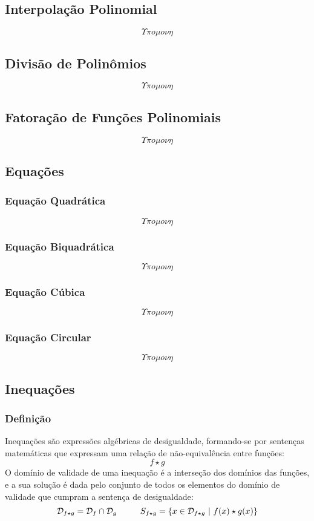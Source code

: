     \subsection{Interpolação Polinomial}
        \[ \Upsilon \pi o \mu o \nu \eta \]
    \subsection{Divisão de Polinômios}
        \[ \Upsilon \pi o \mu o \nu \eta \]
    \subsection{Fatoração de Funções Polinomiais}
        \[ \Upsilon \pi o \mu o \nu \eta \]
\subsection{Equações}
    \subsubsection{Equação Quadrática}
        \[ \Upsilon \pi o \mu o \nu \eta \]
    \subsubsection{Equação Biquadrática}
        \[ \Upsilon \pi o \mu o \nu \eta \]
    \subsubsection{Equação Cúbica}
        \[ \Upsilon \pi o \mu o \nu \eta \]
    \subsubsection{Equação Circular}
        \[ \Upsilon \pi o \mu o \nu \eta \]
\subsection{Inequações}
    \subsubsection{Definição}
        Inequações são expressões algébricas de desigualdade, formando-se por sentenças matemáticas que expressam uma relação de não-equivalência entre funções:
        \[ f \star g \]
        O domínio de validade de uma inequação é a interseção dos domínios das funções, e a sua solução é dada pelo conjunto de todos os elementos do domínio de validade que cumpram a sentença de desigualdade:
        \[\mathcal{D}_{f \star g} = \mathcal{D}_f \cap \mathcal{D}_g \hphantom{---}  S_{f \star g} = \{ x \in \mathcal{D}_{f \star g} \ | \ f(x) \star g(x) \} \]
